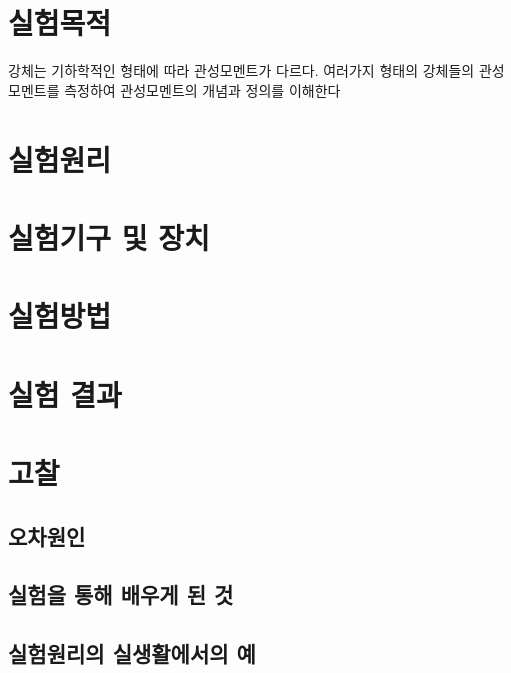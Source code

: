 \documentclass[12pt,a4paper]{article}
\begin{document}
\section{실험목적}
강체는 기하학적인 형태에 따라 관성모멘트가 다르다. 여러가지 형태의 강체들의
관성모멘트를 측정하여 관성모멘트의 개념과 정의를 이해한다
\section{실험원리}
\section{실험기구 및 장치}
\section{실험방법}
\section{실험 결과}
\section{고찰}
\subsection{오차원인}
\subsection{실험을 통해 배우게 된 것}
\subsection{실험원리의 실생활에서의 예}
\end{document}

